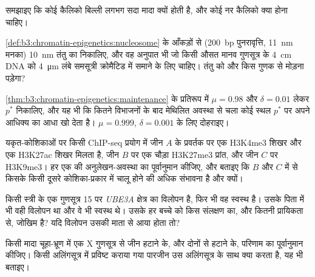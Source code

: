 \begin{exercise}[$\star$]\label{exo:b3:chromatin-epigenetics:4}
समझाइए कि कोई कैलिको बिल्ली लगभग सदा मादा क्यों होती है, और कोई नर
कैलिको क्या होना चाहिए।
\end{exercise}

\begin{exercise}[$\star\star$]\label{exo:b3:chromatin-epigenetics:5}
\cref{def:b3:chromatin-epigenetics:nucleosome} के आँकड़ों से
(\qty{200}{bp} पुनरावृत्ति, \qty{11}{nm} मनका) \qty{10}{nm} तंतु का
 निकालिए, और वह अनुपात भी जो किसी औसत मानव गुणसूत्र के
\qty{4}{cm} DNA को \qty{4}{\micro m} लंबे समसूत्री क्रोमैटिड में समाने
के लिए चाहिए। तंतु को और किस गुणक से मोड़ना पड़ेगा?
\end{exercise}

\begin{exercise}[$\star\star$]\label{exo:b3:chromatin-epigenetics:6}
\cref{thm:b3:chromatin-epigenetics:maintenance} के प्रतिरूप में
$\mu = 0.98$ और $\delta = 0.01$ लेकर $p^{*}$ निकालिए, और यह भी कि कितने
विभाजनों के बाद मेथिलित अवस्था से चला कोई स्थल $p^{*}$ पर अपने आधिक्य
का आधा खो देता है। $\mu = 0.999$, $\delta = 0.001$ के लिए दोहराइए।
\end{exercise}

\begin{exercise}[$\star\star$]\label{exo:b3:chromatin-epigenetics:7}
यकृत-कोशिकाओं पर किसी ChIP-seq प्रयोग में जीन $A$ के प्रवर्तक पर एक
H3K4me3 शिखर और एक H3K27ac शिखर मिलता है, जीन $B$ पर एक चौड़ा H3K27me3
प्रांत, और जीन $C$ पर H3K9me3। हर एक की अनुलेखन-अवस्था का पूर्वानुमान
कीजिए, और बताइए कि $B$ और $C$ में से किसके किसी दूसरे कोशिका-प्रकार में
चालू होने की अधिक संभावना है और क्यों।
\end{exercise}

\begin{exercise}[$\star\star$]\label{exo:b3:chromatin-epigenetics:8}
किसी स्त्री के एक गुणसूत्र 15 पर \emph{UBE3A} क्षेत्र का विलोपन है, फिर
भी वह स्वस्थ है। उसके पिता में भी वही विलोपन था और वे भी स्वस्थ थे।
उसके हर बच्चे को किस संलक्षण का, और कितनी प्रायिकता से, जोखिम है? यदि
विलोपन उसकी माता से आया होता तो?
\end{exercise}

\begin{exercise}[$\star\star$]\label{exo:b3:chromatin-epigenetics:9}
किसी मादा चूहा-भ्रूण में एक X गुणसूत्र से \emph{} जीन हटाने के, और
दोनों से हटाने के, परिणाम का पूर्वानुमान कीजिए। किसी अलिंगसूत्र में
प्रविष्ट कराया गया \emph{} पारजीन उस अलिंगसूत्र के साथ क्या करता
है, यह भी बताइए।
\end{exercise}

